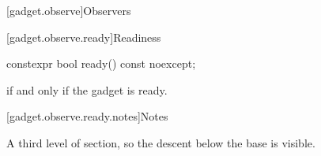 \ifdefined\clausenumber{}\fi
{}[gadget.observe]{Observers}

[gadget.observe.ready]{Readiness}

\begin{itemdecl}
constexpr bool ready() const noexcept;
\end{itemdecl}

\begin{itemdescr}
\pnum
\returns
{} if and only if the gadget is ready.
\end{itemdescr}

[gadget.observe.ready.notes]{Notes}

\pnum
A third level of section, so the descent below the base is visible.
